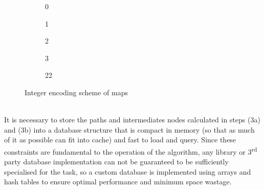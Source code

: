 \documentclass[12pt,notitlepage]{report}
\begin{document}
\begin{figure}
    \centering
    \begin{subfigure}{.18\textwidth}
    \centering
    \caption{0}
    \end{subfigure}
    \begin{subfigure}{.18\textwidth}
    \centering
    \caption{1}
    \end{subfigure}
     \begin{subfigure}{.18\textwidth}
     \centering
    \caption{2}
    \end{subfigure}
    \begin{subfigure}{.18\textwidth}
    \centering
    \caption{3}
    \end{subfigure}
    \begin{subfigure}{.18\textwidth}
    \centering
    \caption{22}
    \end{subfigure}
  \caption{Integer encoding scheme of maps}
\end{figure}

\\
\noindent
It is necessary to store the paths and intermediates nodes calculated in steps (3a) and (3b) into a database structure that is compact in memory (so that as much of it as possible can fit into cache) and fast to load and query. Since these constraints are fundamental to the operation of the algorithm, any library or 3\textsuperscript{rd} party database implementation can not be guaranteed to be sufficiently specialised for the task, so a custom database is implemented using arrays and hash tables to ensure optimal performance and minimum space wastage.\\
\end{document}
